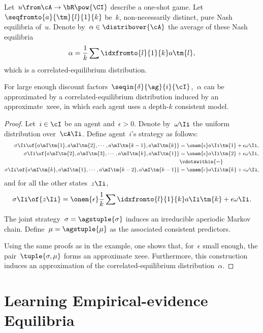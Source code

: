 \begin{corollary}
Let~\(u \from \cA \to \bR\pow{\CI}\) describe a one-shot game.
Let~\(\seqfromto{a}{\tm}{l}{1}{k}\) be~\(k\), non-necessarily distinct, pure Nash equilibria of~\(u\).
Denote by~\(\alpha \in \distribover{\cA}\) the average of these Nash equilibria
\[
\alpha = \frac{1}{k} \sum\idxfromto{l}{1}{k} a\tm{l},
\]
which is a correlated-equilibrium distribution.

For large enough discount factors~\(\seqin{\delta}{\ag}{i}{\cI}\), \(~\alpha\) can be approximated by a correlated-equilibrium distribution induced by an approximate~\ac{xeee}, in which each agent uses a depth-\(k\) consistent model.
\end{corollary}

\begin{proof}
Let~\(i \in \cI\) be an agent and~\(\epsilon > 0\).
Denote by~\(\omega\Ii\) the uniform distribution over~\(\cA\Ii\).
Define agent~\(i\)'s strategy as follows:
\[
\begin{aligned}
\sigma\Ii \of {a\mI\tm{1}, a\mI\tm{2}, \cdots, a\mI\tm{k - 1}, a\mI\tm{k}} &= \onem{\epsilon} a\Ii\tm{1} + \epsilon\omega\Ii, \\
\sigma\Ii \of {a\mI\tm{2}, a\mI\tm{3}, \cdots, a\mI\tm{k}, a\mI\tm{1}} &= \onem{\epsilon}a\Ii\tm{2} + \epsilon\omega\Ii, \\
&\vdotswithin{=} \\
\sigma\Ii \of {a\mI\tm{k}, a\mI\tm{1}, \cdots, a\mI\tm{k - 2}, a\mI\tm{k - 1}} &= \onem{\epsilon}a\Ii\tm{k} + \epsilon\omega\Ii,
\end{aligned}
\]
and for all the other states~\(z\Ii\),
\[
\sigma\Ii \of {z\Ii} = \onem{\epsilon} \frac{1}{k} \sum\idxfromto{l}{1}{k} a\Ii\tm{k} + \epsilon\omega\Ii.
\]

The joint strategy~\(\sigma = \agstuple{\sigma}\) induces an irreducible aperiodic Markov chain.
Define~\(\mu = \agstuple{\mu}\) as the associated consistent predictors.

Using the same proofs as in the example, one shows that, for~\(\epsilon\) small enough, the pair~\(\tuple{\sigma, \mu}\) forms an approximate \ac{xeee}.
Furthermore, this construction induces an approximation of the correlated-equilibrium distribution~\(\alpha\).
\end{proof}

\section{Learning Empirical-evidence Equilibria}
\label{sec:learning_empirical_evidence_equilibria}

